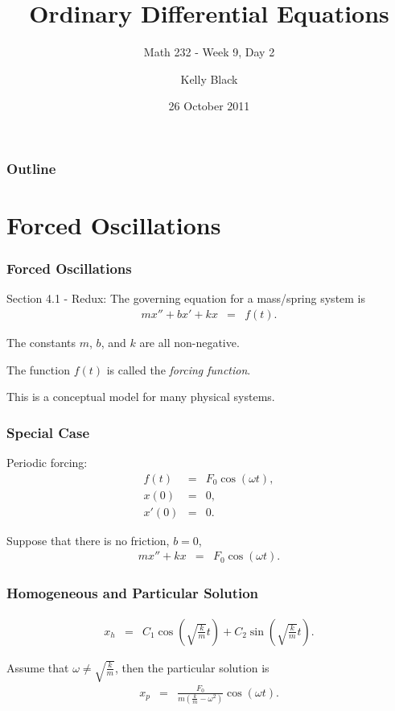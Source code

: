 \documentclass{beamer}
\newcommand{\lp}{\left(}
\newcommand{\rp}{\right)}
\begin{document}
\title{Ordinary Differential Equations}
\subtitle{Math 232 - Week 9, Day 2}

\author{Kelly Black}
\date{26 October 2011}

\begin{frame}
  \titlepage
\end{frame}

\begin{frame}
  \frametitle{Outline}
\end{frame}


\section{Forced Oscillations}


\begin{frame}
  \frametitle{Forced Oscillations}

  Section 4.1 - Redux: The governing equation for a mass/spring system
  is
  \begin{eqnarray*}
    mx'' + bx'+kx & = & f(t).
  \end{eqnarray*}

  The constants $m$, $b$, and $k$ are all non-negative.

  The function $f(t)$ is called the \textit{forcing function}.

  This is a conceptual model for many physical systems.

\end{frame}


\begin{frame}
  \frametitle{Special Case}

  Periodic forcing:
  \begin{eqnarray*}
    f(t) & = & F_0 \cos(\omega t), \\
    x(0) & = & 0, \\
    x'(0) & = & 0.
  \end{eqnarray*}

  Suppose that there is no friction, $b=0$,
  \begin{eqnarray*}
    m x'' + kx & = & F_0 \cos(\omega t).
  \end{eqnarray*}

\end{frame}


\begin{frame}
  \frametitle{Homogeneous and Particular Solution}

  \begin{eqnarray*}
    x_h & = & C_1 \cos\lp\sqrt{\frac{k}{m}}t\rp + C_2 \sin\lp\sqrt{\frac{k}{m}}t\rp.
  \end{eqnarray*}

  Assume that $\omega \neq \sqrt{\frac{k}{m}}$, then the particular
  solution is
  \begin{eqnarray*}
    x_p & = & \frac{F_0}{m\lp\frac{k}{m}-\omega^2\rp} \cos(\omega t).
  \end{eqnarray*}

\end{frame}
\end{document}
